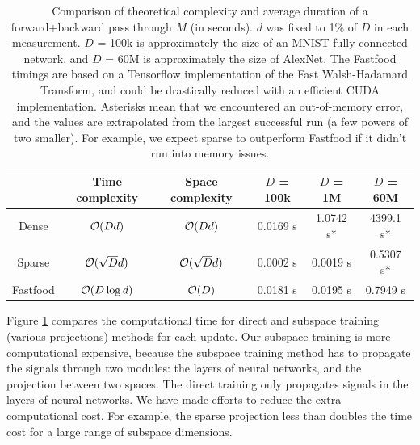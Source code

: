 \documentclass{article} %
\begin{document}
\begin{table}[h]
\centering
\begin{tabular}{c|ccccc}
         & Time complexity & Space complexity & $D$ = 100k & $D$ = 1M & $D$ = 60M \\
\hline
Dense    & $\mathcal{O}(Dd)$         & $\mathcal{O}(Dd)$          & 0.0169 s & 1.0742 s* & 4399.1 s* \\
Sparse   & $\mathcal{O}(\sqrt{D}d)$  & $\mathcal{O}(\sqrt{D}d)$   & 0.0002 s & 0.0019 s & 0.5307 s* \\
Fastfood & $\mathcal{O}(D\log{d})$   & $\mathcal{O}(D)$           & 0.0181 s & 0.0195 s & 0.7949 s


\end{tabular}
\caption{Comparison of theoretical complexity and average duration of a forward+backward pass through $M$ (in seconds). $d$ was fixed to 1\% of $D$ in each measurement. $D$ = 100k is approximately the size of an MNIST fully-connected network, and $D$ = 60M is approximately the size of AlexNet. The Fastfood timings are based on a Tensorflow implementation of the Fast Walsh-Hadamard Transform, and could be drastically reduced with an efficient CUDA implementation. Asterisks mean that we encountered an out-of-memory error, and the values are extrapolated from the largest successful run (a few powers of two smaller). For example, we expect sparse to outperform Fastfood if it didn't run into memory issues.}
\label{tab:matrix-comparison}
\end{table}


Figure \ref{tab:matrix-comparison} compares the computational time for direct and subspace training (various projections) methods for each update. Our subspace training is more computational expensive, because the subspace training method has to propagate the signals through two modules: the layers of neural networks, and the projection between two spaces. The direct training only propagates signals in the layers of neural networks. We have made efforts to reduce the extra computational cost. For example, the sparse projection less than doubles the time cost for a large range of subspace dimensions. 
\end{document}
